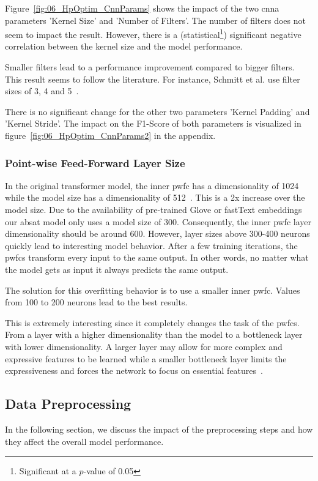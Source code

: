 Figure~\ref{fig:06_HpOptim_CnnParams} shows the impact of the two \gls{cnna} parameters 'Kernel Size' and 'Number of Filters'. The number of filters does not seem to impact the result. However, there is a {(statistical\footnote{Significant at a $p$-value of 0.05})} significant negative correlation between the kernel size and the model performance. 

Smaller filters lead to a performance improvement compared to bigger filters. This result seems to follow the literature. For instance, Schmitt et al. use filter sizes of 3, 4 and 5~\cite{Schmitt2018}.
\medskip

There is no significant change for the other two parameters 'Kernel Padding' and 'Kernel Stride'. The impact on the F1-Score of both parameters is visualized in figure~\ref{fig:06_HpOptim_CnnParams2} in the appendix.

\subsubsection{Point-wise Feed-Forward Layer Size}

In the original transformer model, the inner \acrfull{pwfc} has a dimensionality of 1024 while the model size has a dimensionality of 512~\cite{Vaswani2017c}. This is a 2x increase over the model size. Due to the availability of pre-trained Glove or fastText embeddings our \gls{absat} model only uses a model size of 300. Consequently, the inner \gls{pwfc} layer dimensionality should be around 600. However, layer sizes above 300-400 neurons quickly lead to interesting model behavior. After a few training iterations, the \glspl{pwfc} transform every input to the same output. In other words, no matter what the model gets as input it always predicts the same output.
\medskip

The solution for this overfitting behavior is to use a smaller inner \gls{pwfc}. Values from 100 to 200 neurons lead to the best results.

This is extremely interesting since it completely changes the task of the \glspl{pwfc}. From a layer with a higher dimensionality than the model to a bottleneck layer with lower dimensionality. A larger layer may allow for more complex and expressive features to be learned while a smaller bottleneck layer limits the expressiveness and forces the network to focus on essential features~\cite{Ramsundar2015}.

\subsection{Data Preprocessing}
\label{subsec:06_dataPreprocessing}
In the following section, we discuss the impact of the preprocessing steps and how they affect the overall model performance. 

